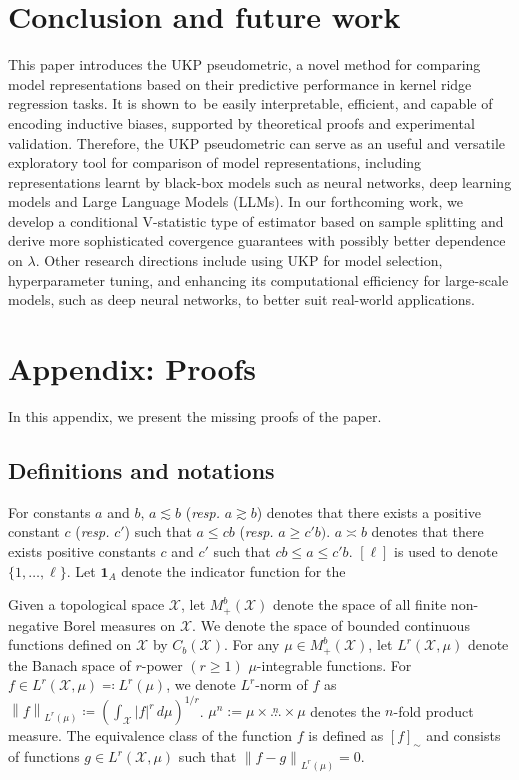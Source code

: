 \documentclass{article} %
\newcommand{\norm}[1]{\left\|#1\right\|}
\newcommand{\metricstname}{UKP }
\theoremstyle{plain}
\begin{document}
\section{Conclusion and future work} \label{conclusion}
This paper introduces the \metricstname pseudometric, a novel method for comparing model representations based on their predictive performance in kernel ridge regression tasks. It is shown to be easily interpretable, efficient, and capable of encoding inductive biases, supported by theoretical proofs and experimental validation. Therefore, the \metricstname pseudometric can serve as an useful and versatile exploratory tool for comparison of model representations, including representations learnt by black-box models such as neural networks, deep learning models and Large Language Models (LLMs). In our forthcoming work, we develop a conditional V-statistic type of estimator based on sample splitting and derive more sophisticated covergence guarantees with possibly better dependence on $\lambda$. Other research directions include using \metricstname for model selection, hyperparameter tuning, and enhancing its computational efficiency for large-scale models, such as deep neural networks, to better suit real-world applications.




\appendix
\section{Appendix: Proofs}\label{Proofs}
In this appendix, we present the missing proofs of the paper.

\subsection{Definitions and notations}

For constants $a$ and $b$, $a \lesssim b$ (\emph{resp.} $a \gtrsim b$) denotes that there exists a positive constant $c$ (\emph{resp.} $c'$) such that $a\leq cb$ (\emph{resp.} $a \geq c' b)$. $a \asymp b$ denotes that there exists positive constants $c$ and $c'$ such that $cb \leq a \leq c' b$. $[\ell]$ is used to denote $\{1,\ldots,\ell\}$. Let $\mathbf{1}_{A}$ denote the indicator function for the 

Given a topological space $\mathcal{X}$, let $M^{b}_{+}(\mathcal{X})$ denote the space of all finite non-negative Borel measures on $\mathcal{X}$. We denote the space of bounded continuous functions defined on $\mathcal{X}$ by $C_{b}(\mathcal{X})$. For any $\mu \in M^{b}_{+}(\mathcal{X})$, let $L^r(\mathcal{X},\mu)$ denote the Banach space of $r$-power $(r\geq 1)$ $\mu$-integrable functions. For $f \in L^r(\mathcal{X},\mu)\eqcolon L^r(\mu)$, we denote $L^r$-norm of $f$ as $\norm{f}_{L^r(\mu)}\coloneq (\int_{\mathcal{X}}|f|^r\,d\mu)^{1/r}$. $\mu^n := \mu \times \stackrel{n}{...} \times \mu$ denotes the $n$-fold product measure. The equivalence class of the function $f$ is defined as $[f]_{\sim}$ and consists of functions $g \in L^r(\mathcal{X},\mu)$ such that $\norm{f-g}_{L^r(\mu)}=0$. 
\end{document}
